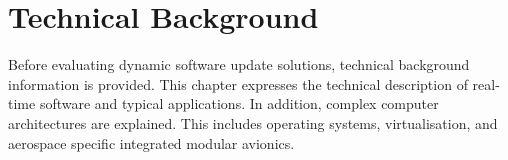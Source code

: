 \chapter{Technical Background}

Before evaluating dynamic software update solutions, technical background information is provided. This chapter expresses the technical description of real-time software and typical applications. In addition, complex computer architectures are explained. This includes operating systems, virtualisation, and aerospace specific integrated modular avionics.

\newpage

